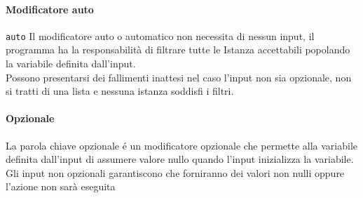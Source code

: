 \paragraph{Modificatore auto} \lstinline|auto|
Il modificatore auto o automatico non necessita di nessun input, il programma ha la responsabilità di
filtrare tutte le Istanza accettabili popolando la variabile definita dall'input. \\
Possono presentarsi dei fallimenti inattesi nel caso l'input non sia opzionale,
non si tratti di una lista e nessuna istanza soddisfi i filtri.

\paragraph{Opzionale}
La parola chiave opzionale é un modificatore opzionale che permette alla variabile definita dall'input
di assumere valore nullo quando l'input inizializza la variabile. \\ 
Gli input non opzionali garantiscono che forniranno dei valori non nulli oppure l'azione non sarà eseguita

